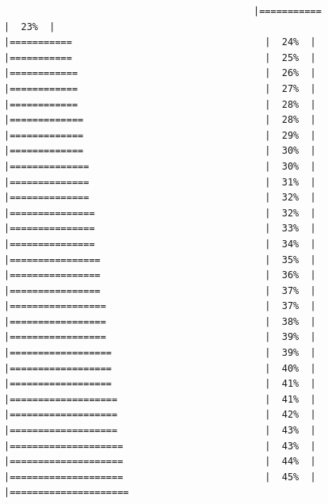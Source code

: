\documentclass[
  krantz2]{krantz}
\begin{document}
\begin{verbatim}
                                            |===========                                  |  23%  |                                                     |===========                                  |  24%  |                                                     |===========                                  |  25%  |                                                     |============                                 |  26%  |                                                     |============                                 |  27%  |                                                     |============                                 |  28%  |                                                     |=============                                |  28%  |                                                     |=============                                |  29%  |                                                     |=============                                |  30%  |                                                     |==============                               |  30%  |                                                     |==============                               |  31%  |                                                     |==============                               |  32%  |                                                     |===============                              |  32%  |                                                     |===============                              |  33%  |                                                     |===============                              |  34%  |                                                     |================                             |  35%  |                                                     |================                             |  36%  |                                                     |================                             |  37%  |                                                     |=================                            |  37%  |                                                     |=================                            |  38%  |                                                     |=================                            |  39%  |                                                     |==================                           |  39%  |                                                     |==================                           |  40%  |                                                     |==================                           |  41%  |                                                     |===================                          |  41%  |                                                     |===================                          |  42%  |                                                     |===================                          |  43%  |                                                     |====================                         |  43%  |                                                     |====================                         |  44%  |                                                     |====================                         |  45%  |                                                     |=====================             
\end{verbatim}
\end{document}
